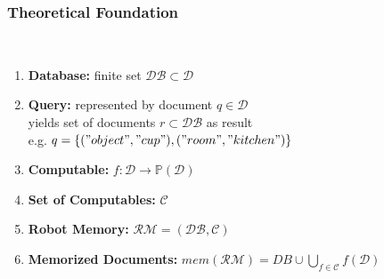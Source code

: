 \begin{frame}
  \frametitle{Theoretical Foundation}
  \begin{description}[]
  \item[Definition Robot Memory] \hfill \\
    \begin{enumerate}
      \item \textbf{Database:} finite set $\mathcal{DB} \subset \mathcal{D}$
      \item \textbf{Query:} represented by document $q\in\mathcal{D}$\\
      yields set of documents $r\subset\mathcal{DB}$ as result\\
      e.g. $q=\{("object","cup"),("room","kitchen")\}$
      \item \textbf{Computable:} $f: \mathcal{D} \rightarrow \mathbb{P}(\mathcal{D})$
      \item \textbf{Set of Computables:} $\mathcal{C}$
      \item \textbf{Robot Memory:} $\mathcal{RM}=(\mathcal{DB},\mathcal{C})$
      \item \textbf{Memorized Documents:} $mem(\mathcal{RM})=DB \cup \bigcup_{f\in\mathcal{C}}f(\mathcal{D})$
    \end{enumerate}
  \end{description}  
\end{frame}

